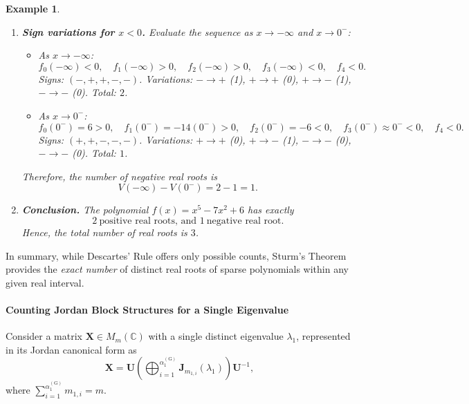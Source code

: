 \documentclass[11pt]{article}
\newtheorem{example}{Example}
\begin{document}
\begin{example}
\begin{enumerate}
    \item \textbf{Sign variations for \(x < 0\).}
    Evaluate the sequence as \(x \to -\infty\) and \(x \to 0^-\):
    \begin{itemize}
        \item As \(x \to -\infty\):
        \[
        f_0(-\infty) < 0, \quad f_1(-\infty) > 0, \quad f_2(-\infty) > 0, \quad f_3(-\infty) < 0, \quad f_4 < 0.
        \]
        Signs: \((- , + , + , - , -)\).  
        Variations: \(- \to +\) (1), \(+ \to +\) (0), \(+ \to -\) (1), \(- \to -\) (0).  
        Total: \(2\).
        
        \item As \(x \to 0^-\):
        \[
        f_0(0^-) = 6 > 0, \quad f_1(0^-) = -14(0^-) > 0, \quad f_2(0^-) = -6 < 0, \quad f_3(0^-) \approx 0^- < 0, \quad f_4 < 0.
        \]
        Signs: \((+, +, -, -, -)\).  
        Variations: \(+ \to +\) (0), \(+ \to -\) (1), \(- \to -\) (0), \(- \to -\) (0).  
        Total: \(1\).
    \end{itemize}
    Therefore, the number of negative real roots is
    \[
    V(-\infty) - V(0^-) = 2 - 1 = 1.
    \]

    \item \textbf{Conclusion.}  
    The polynomial \(f(x) = x^5 - 7x^2 + 6\) has exactly
    \[
    2 \ \text{positive real roots, and } 1 \ \text{negative real root.}
    \]
    Hence, the total number of real roots is \(3\).
\end{enumerate}
\end{example}


In summary, while Descartes’ Rule offers only possible counts, Sturm’s Theorem provides the \emph{exact number} of distinct real roots of sparse polynomials within any given real interval.


\paragraph{Counting Jordan Block Structures for a Single Eigenvalue}\label{sec':Jordan_count_S_One Distinct Eigenvalue_N}


Consider a matrix $\bm X \in M_m(\mathbb{C})$ with a single distinct eigenvalue $\lambda_1$, represented in its Jordan canonical form as
\begin{equation}\label{eq:X_Jordan_single}
\bm{X} = \bm{U} \left( \bigoplus_{i=1}^{\alpha_1^{(\mathrm{G})}} \bm{J}_{m_{1,i}}(\lambda_1) \right) \bm{U}^{-1},
\end{equation}
where $\sum_{i=1}^{\alpha_1^{(\mathrm{G})}} m_{1,i} = m$.
\end{document}
